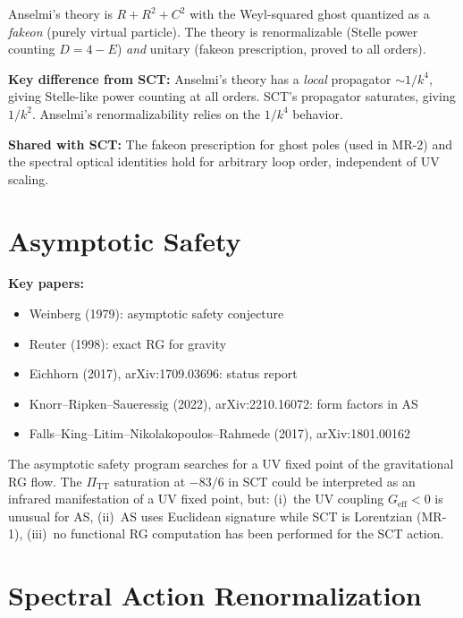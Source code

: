 \documentclass[12pt,a4paper]{article}
\begin{document}
Anselmi's theory is $R + R^2 + C^2$ with the Weyl-squared ghost quantized
as a \emph{fakeon} (purely virtual particle). The theory is renormalizable
(Stelle power counting $D = 4 - E$) \emph{and} unitary (fakeon
prescription, proved to all orders).

\textbf{Key difference from SCT:} Anselmi's theory has a \emph{local}
propagator $\sim 1/k^4$, giving Stelle-like power counting at all orders.
SCT's propagator saturates, giving $1/k^2$. Anselmi's renormalizability
relies on the $1/k^4$ behavior.

\textbf{Shared with SCT:} The fakeon prescription for ghost poles
(used in MR-2) and the spectral optical identities hold for arbitrary
loop order, independent of UV scaling.

\section{Asymptotic Safety}
\label{sec:AS}

\textbf{Key papers:}
\begin{itemize}
  \item Weinberg (1979): asymptotic safety conjecture
  \item Reuter (1998): exact RG for gravity
  \item Eichhorn (2017), arXiv:1709.03696: status report
  \item Knorr--Ripken--Saueressig (2022), arXiv:2210.16072: form factors in AS
  \item Falls--King--Litim--Nikolakopoulos--Rahmede (2017), arXiv:1801.00162
\end{itemize}

The asymptotic safety program searches for a UV fixed point of the gravitational
RG flow. The $\Pi_{\mathrm{TT}}$ saturation at $-83/6$ in SCT could be
interpreted as an infrared manifestation of a UV fixed point, but:
(i)~the UV coupling $G_{\mathrm{eff}} < 0$ is unusual for AS,
(ii)~AS uses Euclidean signature while SCT is Lorentzian (MR-1),
(iii)~no functional RG computation has been performed for the SCT action.

\section{Spectral Action Renormalization}
\label{sec:spectral-action}
\end{document}

